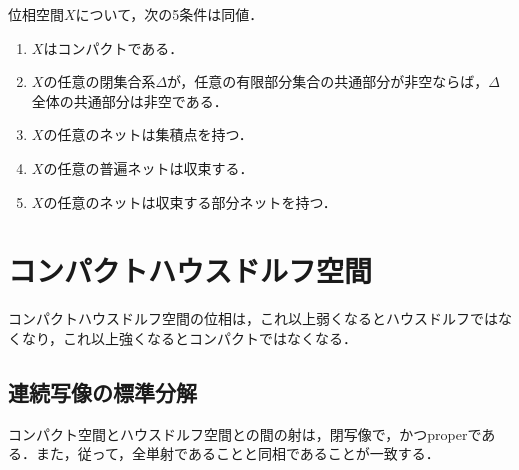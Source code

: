 \documentclass[uplatex,dvipdfmx]{jsreport}
\begin{document}
\begin{theorem}[(AC)]
    位相空間$X$について，次の5条件は同値．
    \begin{enumerate}
        \item $X$はコンパクトである．
        \item $X$の任意の閉集合系$\Delta$が，任意の有限部分集合の共通部分が非空ならば，$\Delta$全体の共通部分は非空である．
        \item $X$の任意のネットは集積点を持つ．
        \item $X$の任意の普遍ネットは収束する．
        \item $X$の任意のネットは収束する部分ネットを持つ．
    \end{enumerate}
\end{theorem}

\section{コンパクトハウスドルフ空間}

\begin{tcolorbox}[colframe=ForestGreen, colback=ForestGreen!10!white,breakable,colbacktitle=ForestGreen!40!white,coltitle=black,fonttitle=\bfseries\sffamily,
title=]
    コンパクトハウスドルフ空間の位相は，これ以上弱くなるとハウスドルフではなくなり，これ以上強くなるとコンパクトではなくなる．
\end{tcolorbox}

\subsection{連続写像の標準分解}

\begin{tcolorbox}[colframe=ForestGreen, colback=ForestGreen!10!white, breakable ,colbacktitle=ForestGreen!40!white, coltitle=black,fonttitle=\bfseries\sffamily
    ,title=コンパクト空間とハウスドルフ空間との間のHom集合]
    コンパクト空間とハウスドルフ空間との間の射は，閉写像で，かつproperである．また，従って，全単射であることと同相であることが一致する．
\end{tcolorbox}
\end{document}
